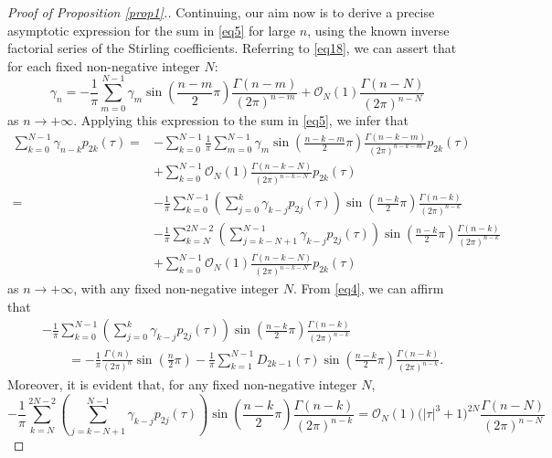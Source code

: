 \documentclass[11pt]{article}
\numberwithin{equation}{section}
\numberwithin{equation}{section}
\begin{document}
\begin{proof}[Proof of Proposition \ref{prop1}.]
Continuing, our aim now is to derive a precise asymptotic expression for the sum in \eqref{eq5} for large $n$, using the known inverse factorial series of the Stirling coefficients. Referring to \eqref{eq18}, we can assert that for each fixed non-negative integer $N$:
\[
\gamma _n = -\frac{1}{\pi}\sum_{m = 0}^{N- 1} \gamma _m \sin\left( \frac{n - m}{2}\pi \right)\frac{\Gamma (n - m)}{(2\pi )^{n - m}} + \mathcal{O}_N(1) \frac{\Gamma (n - N)}{(2\pi )^{n - N} }
\]
as $n\to+\infty$. Applying this expression to the sum in \eqref{eq5}, we infer that
\begin{align*}
\sum_{k = 0}^{N - 1} \gamma _{n - k} p_{2k} (\tau ) = & -\sum_{k = 0}^{N - 1} \frac{1}{\pi}\sum_{m = 0}^{N - 1} \gamma _m \sin \left( \frac{n - k - m}{2}\pi \right)\frac{\Gamma (n - k - m)}{(2\pi )^{n - k - m} } p_{2k} (\tau ) \\ & + \sum_{k = 0}^{N - 1} \mathcal{O}_N(1) \frac{\Gamma (n - k - N)}{(2\pi )^{n - k - N} }p_{2k} (\tau )
\\ = &-\frac{1}{\pi }\sum_{k = 0}^{N - 1} \left( \sum_{j = 0}^k \gamma _{k - j} p_{2j} (\tau ) \right)\sin \left( \frac{n - k}{2}\pi \right)\frac{\Gamma (n - k)}{(2\pi )^{n - k} } \\ &- \frac{1}{\pi }\sum_{k = N}^{2N- 2} \left( \sum_{j = k - N + 1}^{N-1} \gamma _{k - j} p_{2j} (\tau ) \right)\sin \left( \frac{n - k}{2}\pi\right)\frac{\Gamma (n - k)}{(2\pi )^{n - k}}
\\ & + \sum_{k = 0}^{N - 1} \mathcal{O}_N(1) \frac{\Gamma (n - k - N)}{(2\pi )^{n - k - N} }p_{2k} (\tau )
\end{align*}
as $n\to+\infty$, with any fixed non-negative integer $N$. From \eqref{eq4}, we can affirm that
\begin{align*}
&-\frac{1}{\pi }\sum_{k = 0}^{N - 1} \left( \sum_{j = 0}^k \gamma _{k - j} p_{2j} (\tau ) \right)\sin \left( \frac{n - k}{2}\pi \right)\frac{\Gamma (n - k)}{(2\pi )^{n - k} } \\ &\qquad= -\frac{1}{\pi}\frac{\Gamma (n)}{(2\pi )^n } \sin \left( \frac{n}{2}\pi \right)-\frac{1}{\pi}\sum_{k = 1}^{N - 1} D_{2k - 1} (\tau )\sin \left( \frac{n - k}{2}\pi \right)\frac{\Gamma (n - k)}{(2\pi )^{n - k}}.
\end{align*}
Moreover, it is evident that, for any fixed non-negative integer $N$,
\[
- \frac{1}{\pi }\sum_{k = N}^{2N-2} \left( \sum_{j = k - N + 1}^{N-1} \gamma _{k - j} p_{2j} (\tau ) \right)\sin \left( \frac{n - k}{2}\pi\right)\frac{\Gamma (n - k)}{(2\pi )^{n - k}}= \mathcal{O}_N (1)\bigl(\left| \tau \right|^3 + 1\bigr)^{2N} \frac{\Gamma (n - N)}{(2\pi )^{n - N}}
\]
\end{proof}
\end{document}
